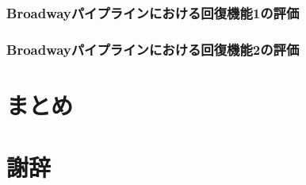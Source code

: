 \documentclass[a4paper]{jreport}	%
\begin{document}
\subsection{Broadwayパイプラインにおける回復機能1の評価} 

\subsection{Broadwayパイプラインにおける回復機能2の評価}



\chapter{まとめ}

\chapter*{謝辞}



\newpage
{}
\renewcommand{\bibname}{参考文献}

%
%
\end{document}
